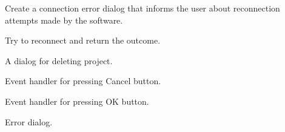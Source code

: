\documentclass[letterpaper,10pt,english]{sphinxmanual}
\begin{document}

\begin{fulllineitems}
\label{dialogs:dialogs.ConnectionErrorDialog}
Create a connection error dialog that informs the user about reconnection
attempts made by the software.

\begin{fulllineitems}
\label{dialogs:dialogs.ConnectionErrorDialog.GetResult}
Try to reconnect and return the outcome.

\end{fulllineitems}


\end{fulllineitems}


\begin{fulllineitems}
\label{dialogs:dialogs.DeleteProjectDialog}
A dialog for deleting project.

\begin{fulllineitems}
\label{dialogs:dialogs.DeleteProjectDialog.OnCancel}
Event handler for pressing Cancel button.

\end{fulllineitems}


\begin{fulllineitems}
\label{dialogs:dialogs.DeleteProjectDialog.OnOk}
Event handler for pressing OK button.

\end{fulllineitems}


\end{fulllineitems}


\begin{fulllineitems}
\label{dialogs:dialogs.ErrorDialog}
Error dialog.

\end{fulllineitems}
\end{document}
